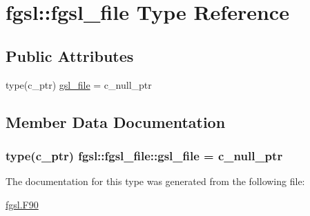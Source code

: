 \hypertarget{structfgsl_1_1fgsl__file}{}\section{fgsl\+:\+:fgsl\+\_\+file Type Reference}
\label{structfgsl_1_1fgsl__file}
\subsection*{Public Attributes}
\begin{DoxyCompactItemize}
\item 
type(c\+\_\+ptr) \hyperlink{structfgsl_1_1fgsl__file_af456e8d82976ae4010ef4beb7573f13b}{gsl\+\_\+file} = c\+\_\+null\+\_\+ptr
\end{DoxyCompactItemize}


\subsection{Member Data Documentation}
\hypertarget{structfgsl_1_1fgsl__file_af456e8d82976ae4010ef4beb7573f13b}{}
\subsubsection[{gsl\+\_\+file}]{\setlength{\rightskip}{0pt plus 5cm}type(c\+\_\+ptr) fgsl\+::fgsl\+\_\+file\+::gsl\+\_\+file = c\+\_\+null\+\_\+ptr}\label{structfgsl_1_1fgsl__file_af456e8d82976ae4010ef4beb7573f13b}


The documentation for this type was generated from the following file\+:\begin{DoxyCompactItemize}
\item 
\hyperlink{fgsl_8F90}{fgsl.\+F90}\end{DoxyCompactItemize}
